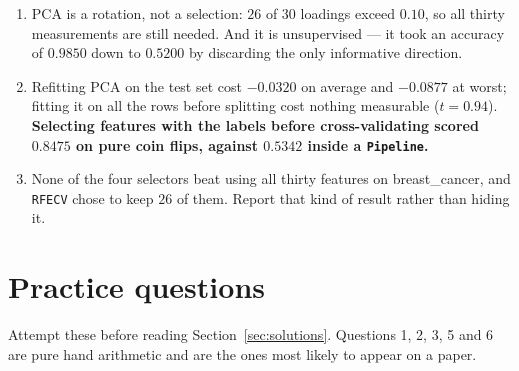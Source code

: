 \documentclass[11pt]{article}
\begin{document}
\begin{enumerate}[leftmargin=*]
    widest column. Standardised: $44.27\%$, and $95\%$ needed $10$ of $30$
    components --- but $40$ of $64$ on digits. Variance kept and relative
    reconstruction error always sum to $100\%$.
  \item PCA is a rotation, not a selection: $26$ of $30$ loadings exceed
    $0.10$, so all thirty measurements are still needed. And it is
    unsupervised --- it took an accuracy of $0.9850$ down to $0.5200$ by
    discarding the only informative direction.
  \item Refitting PCA on the test set cost $-0.0320$ on average and
    $-0.0877$ at worst; fitting it on all the
    rows before splitting cost nothing measurable ($t = 0.94$).
    \textbf{Selecting features with the labels before cross-validating scored
    $0.8475$ on pure coin flips, against $0.5342$ inside a
    \texttt{Pipeline}.}
  \item None of the four selectors beat using all thirty features on
    breast\_cancer, and \texttt{RFECV} chose to keep $26$ of them. Report that
    kind of result rather than hiding it.
\end{enumerate}

\section{Practice questions}

Attempt these before reading Section~\ref{sec:solutions}. Questions 1, 2, 3, 5
and 6 are pure hand arithmetic and are the ones most likely to appear on a
paper.
\end{document}
